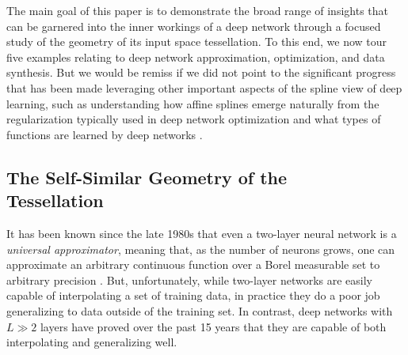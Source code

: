 \documentclass{notices}
\begin{document}
The main goal of this paper is to demonstrate the broad range of insights that can be garnered into the inner workings of a deep network through a focused study of the geometry of its input space tessellation.
To this end, we now tour five examples relating to deep network approximation, optimization, and data synthesis.
But we would be remiss if we did not point to the significant progress that has been made leveraging other important aspects of the spline view of deep learning, such as %
understanding how affine splines emerge naturally from the regularization typically used in deep network optimization \cite{unser2019representer} 
and 
what types of functions are learned by deep networks \cite{Parhi_2022}.

 





\subsection*{The Self-Similar Geometry of the \\ Tessellation}


It has been known since the late 1980s that even a two-layer neural network is a {\em universal approximator}, meaning that, as the number of neurons grows, one can approximate an arbitrary continuous function over a Borel measurable set to arbitrary precision \cite{cybenko}. 
But, unfortunately, while two-layer networks are easily capable of interpolating a set of training data, in practice they do a poor job generalizing to data outside of the training set.
In contrast, deep networks with $L\gg 2$ layers have proved over the past 15 years that they are capable of both interpolating and generalizing well.
\end{document}
